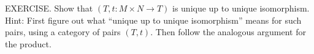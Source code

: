 EXERCISE. Show that $(T,t:M\times N\to T)$ is unique up to unique isomorphism. Hint: First figure out what “unique up to unique isomorphism” means for such pairs, using a category of pairs $(T,t)$. Then follow the analogous argument for the product.
